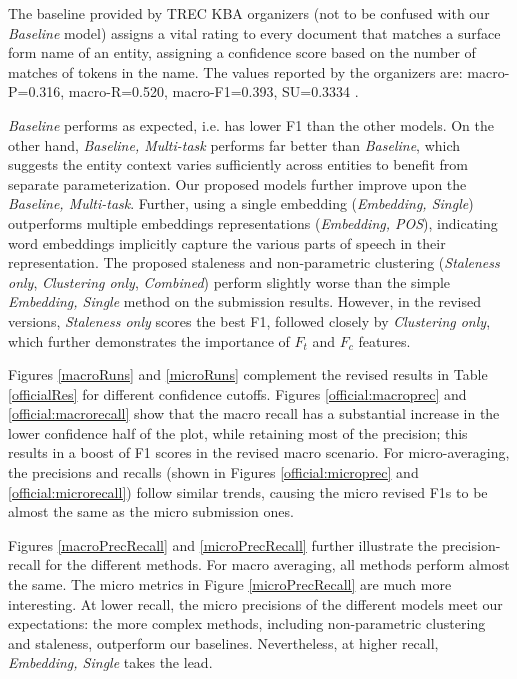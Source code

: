 \documentclass{article}
\begin{document}
The baseline provided by TREC KBA organizers (not to be confused with our \emph{Baseline} model) assigns a vital rating to every document that matches a surface form name of an entity, assigning a confidence score based on the number of matches of tokens in the name. The values reported by the organizers are: macro-P=0.316, macro-R=0.520, macro-F1=0.393, SU=0.3334 \cite{frank14:overview}.

{\textit{Baseline}} performs as expected, i.e. has lower F1 than the other models.
On the other hand, {\textit{Baseline, Multi-task}} performs far better than {\textit{Baseline}}, which suggests the entity context varies sufficiently across entities to benefit from separate parameterization.
Our proposed models further improve upon the {\textit{Baseline, Multi-task}}. 
Further, using a single embedding ({\textit{Embedding, Single}}) outperforms multiple embeddings representations ({\textit{Embedding, POS}}), indicating word embeddings implicitly capture the various parts of speech in their representation.
The proposed staleness and non-parametric clustering ({\textit{Staleness only}}, {\textit{Clustering only}}, {\textit{Combined}}) perform slightly worse than the simple {\textit{Embedding, Single}} method on the submission results. 
However, in the revised versions, {\textit{Staleness only}} scores the best F1, followed closely by {\textit{Clustering only}}, which further demonstrates the importance of $F_t$ and $F_c$ features.

Figures \ref{macroRuns} and \ref{microRuns} complement the revised results in Table \ref{officialRes} for different confidence cutoffs. Figures \ref{official:macroprec} and \ref{official:macrorecall} show that the macro recall has a substantial increase in the lower confidence half of the plot, while retaining most of the precision; this results in a boost of F1 scores in the revised macro scenario.
For micro-averaging, the precisions and recalls (shown in Figures \ref{official:microprec} and \ref{official:microrecall}) follow similar trends, causing the micro revised F1s to be almost the same as the micro submission ones. 

Figures \ref{macroPrecRecall} and \ref{microPrecRecall} further illustrate the precision-recall for the different methods. For macro averaging, all methods perform almost the same. The micro metrics in Figure \ref{microPrecRecall} are much more interesting. At lower recall, the micro precisions of the different models meet our expectations: the more complex methods, including non-parametric clustering and staleness, outperform our baselines. Nevertheless, at higher recall, {\textit{Embedding, Single}} takes the lead.
\end{document}
